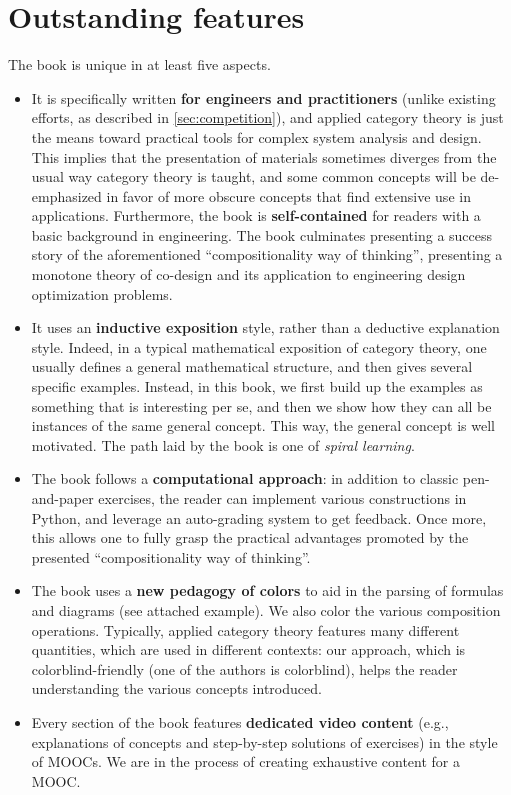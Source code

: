 \documentclass[10pt, article, one side]{memoir}
\begin{document}
    \section{Outstanding features}
    The book is unique in at least five aspects.
    \begin{itemize}
        \item It is specifically written \textbf{for engineers and practitioners} (unlike existing efforts, as described in \cref{sec:competition}), and applied category theory is just the means toward practical tools for complex system analysis and design.
              This implies that the presentation of materials sometimes diverges from the usual way category theory is taught, and some common concepts will be de-emphasized in favor of more obscure concepts that find extensive use in applications.
              Furthermore, the book is \textbf{self-contained} for readers with a basic background in engineering.
              The book culminates presenting a success story of the aforementioned “compositionality way of thinking”, presenting a monotone theory of co-design and its application to engineering design optimization problems.
        \item It uses an \textbf{inductive exposition} style, rather than a deductive explanation style.
              Indeed, in a typical mathematical exposition of category theory, one usually defines a general mathematical structure, and then gives several specific examples.
              Instead, in this book, we first build up the examples as something that is interesting per se, and then we show how they can all be instances of the same general concept.
              This way, the general concept is well motivated.
              The path laid by the book is one of \emph{spiral learning}.
        \item The book follows a \textbf{computational approach}: in addition to classic pen-and-paper exercises, the reader can implement various constructions in Python, and leverage an auto-grading system to get feedback.
              Once more, this allows one to fully grasp the practical advantages promoted by the presented ``compositionality way of thinking''.
        \item The book uses a \textbf{new pedagogy of colors} to aid in the parsing of formulas and diagrams (see attached example).
              We also color the various composition operations.
              Typically, applied category theory features many different quantities, which are used in different contexts: our approach, which is colorblind-friendly (one of the authors is colorblind), helps the reader understanding the various concepts introduced.

              \begin{center}
              \end{center}
        \item Every section of the book features \textbf{dedicated video content} (e.g., explanations of concepts and step-by-step solutions of exercises) in the style of MOOCs.
              We are in the process of creating exhaustive content for a MOOC.
    \end{itemize}
\end{document}
